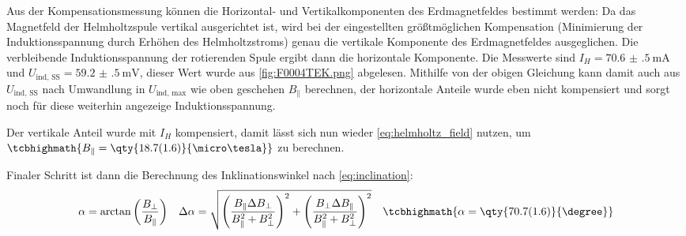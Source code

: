 Aus der Kompensationsmessung können die Horizontal- und Vertikalkomponenten des Erdmagnetfeldes bestimmt werden: Da das Magnetfeld der Helmholtzspule vertikal ausgerichtet ist, wird bei der eingestellten größtmöglichen Kompensation (Minimierung der Induktionsspannung durch Erhöhen des Helmholtzstroms) genau die vertikale Komponente des Erdmagnetfeldes ausgeglichen. Die verbleibende Induktionsspannung der rotierenden Spule ergibt dann die horizontale Komponente. Die Messwerte sind \(I_H=\qty{70.6(5)}{\milli\ampere}\) und \(U_\text{ind, SS}=\qty{59.2(5)}{\milli\volt}\), dieser Wert wurde aus \cref{fig:F0004TEK.png} abgelesen. 
Mithilfe von der obigen Gleichung kann damit auch aus \(U_\text{ind, SS}\) nach Umwandlung in \(U_\text{ind, max}\) wie oben geschehen \(B_\parallel\) berechnen, der horizontale Anteile wurde eben nicht kompensiert und sorgt noch für diese weiterhin angezeige Induktionsspannung.

Der vertikale Anteil wurde mit \(I_H\) kompensiert, damit lässt sich nun wieder \cref{eq:helmholtz_field} nutzen, um \(\tcbhighmath{B_\parallel=\qty{18.7(1.6)}{\micro\tesla}}\) zu berechnen. 

Finaler Schritt ist dann die Berechnung des Inklinationswinkel nach \cref{eq:inclination}:
\begin{align}
    \alpha=\arctan\left(\frac{B_\perp}{B_\parallel}\right)&&\Delta \alpha=\sqrt{\left(\frac{B_\parallel\Delta B_\perp}{B_\parallel^2+B_\perp^2}\right)^2+\left(\frac{B_\perp\Delta B_\parallel}{B_\parallel^2+B_\perp^2}\right)^2}&&\tcbhighmath{\alpha=\qty{70.7(1.6)}{\degree}}
\end{align}



